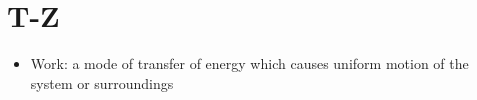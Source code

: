 \documentclass[
]{book}
\providecommand{\tightlist}{%
  \setlength{\itemsep}{0pt}\setlength{\parskip}{0pt}}
\begin{document}
\hypertarget{t-z}{%
\section*{T-Z}\label{t-z}}

\begin{itemize}
\tightlist
\item
  Work: a mode of transfer of energy which causes uniform motion of the system or surroundings
\end{itemize}

  
\end{document}
